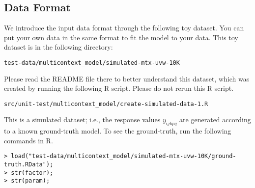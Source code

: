 \documentclass[10pt]{article}
\begin{document}
\subsection{Data Format}
\label{sec:data}

We introduce the input data format through the following toy dataset.  You can put your own data in the same format to fit the model to your data.  This toy dataset is in the following directory:
\begin{verbatim}
test-data/multicontext_model/simulated-mtx-uvw-10K
\end{verbatim}
Please read the README file there to better understand this dataset, which was created by running the following R script.  Please do not rerun this R script.
\begin{verbatim}
src/unit-test/multicontext_model/create-simulated-data-1.R
\end{verbatim}
This is a simulated dataset; i.e., the response values $y_{ijkpq}$ are generated according to a known ground-truth model.  To see the ground-truth, run the following commands in R.
{\small
\begin{verbatim}
> load("test-data/multicontext_model/simulated-mtx-uvw-10K/ground-truth.RData");
> str(factor);
> str(param);
\end{verbatim}
}
\end{document}
